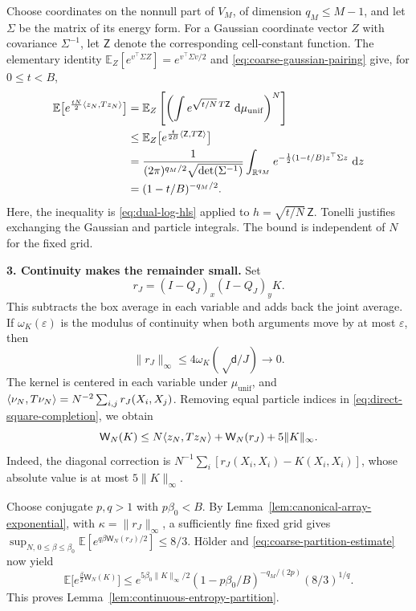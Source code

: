 \documentclass[11pt,reqno]{amsart}
\numberwithin{equation}{section}
\theoremstyle{plain}
\theoremstyle{definition}
\DeclarePairedDelimiter{\ip}{\langle}{\rangle}
\renewcommand{\d}{\mathsf d}
\newcommand{\dd}{\mathop{}\!\mathrm d}
\newcommand{\R}{\mathbb R}
\newcommand{\E}{\mathbb E}
\newcommand{\be}{\beta}
\newcommand{\muunif}{\mu_{\mathrm{unif}}}
\begin{document}
Choose coordinates on the nonnull part of $V_M$, of dimension $q_M\le M-1$, and let $\Sigma$ be the matrix of its energy form.  For a Gaussian coordinate vector $Z$ with covariance $\Sigma^{-1}$, let $\mathsf Z$ denote the corresponding cell-constant function.  The elementary identity
$\E_Z[e^{v^\top\Sigma Z}]=e^{v^\top\Sigma v/2}$ and \eqref{eq:coarse-gaussian-pairing} give, for $0\le t<B$,
\begin{equation}
 \begin{aligned}
 \E\big[e^{\frac{tN}2\ip{z_N,Tz_N}}\big]
 &=\E_Z\left[\left(\int e^{\sqrt{t/N}\,T\mathsf Z}
                           \,\dd\muunif\right)^N\right]\\
 &\le\E_Z\big[e^{\frac{t}{2B}\ip{\mathsf Z,T\mathsf Z}}\big]\\
 &=\frac1{(2\pi)^{q_M/2}\sqrt{\det(\Sigma^{-1})}}
   \int_{\R^{q_M}}e^{-\frac12(1-t/B)z^\top\Sigma z}\,\dd z\\
 &=(1-t/B)^{-q_M/2}.
 \end{aligned}
 \label{eq:coarse-partition-estimate}
\end{equation}
Here, the inequality is \eqref{eq:dual-log-hls} applied to
$h=\sqrt{t/N}\,\mathsf Z$.  Tonelli justifies exchanging the Gaussian and particle integrals.  The bound is independent of $N$ for the fixed grid.

\textbf{3. Continuity makes the remainder small.}
Set
\begin{equation}
 r_J=(I-Q_J)_x(I-Q_J)_yK.
 \label{eq:general-cell-centering}
\end{equation}
This subtracts the box average in each variable and adds back the joint average.  If $\omega_K(\varepsilon)$ is the modulus of continuity when both arguments move by at most $\varepsilon$, then
\begin{equation}
 \|r_J\|_\infty\le4\omega_K(\sqrt\d/J)\longrightarrow0.
 \label{eq:continuous-small-remainder}
\end{equation}
The kernel is centered in each variable under $\muunif$, and
$\ip{\nu_N,T\nu_N}=N^{-2}\sum_{i,j}r_J(X_i,X_j)$.
Removing equal particle indices in \eqref{eq:direct-square-completion}, we obtain
\begin{equation}
 \mathsf W_N(K)\le N\ip{z_N,Tz_N}
                  +\mathsf W_N(r_J)+5\|K\|_\infty.
 \label{eq:diagonal-correction-bound}
\end{equation}
Indeed, the diagonal correction is
$N^{-1}\sum_i[r_J(X_i,X_i)-K(X_i,X_i)]$, whose absolute value is at most $5\|K\|_\infty$.

Choose conjugate $p,q>1$ with $p\be_0<B$.  By Lemma~\ref{lem:canonical-array-exponential}, with $\kappa=\|r_J\|_\infty$, a sufficiently fine fixed grid gives
$\sup_{N,\,0\le\be\le\be_0}\E[e^{q\be\mathsf W_N(r_J)/2}]\le8/3$.
H\"older and \eqref{eq:coarse-partition-estimate} now yield
\begin{equation}
 \E\big[e^{\frac\be2\mathsf W_N(K)}\big]
 \le e^{5\be_0\|K\|_\infty/2}
      (1-p\be_0/B)^{-q_M/(2p)}(8/3)^{1/q}.
 \label{eq:continuous-proof-conclusion}
\end{equation}
This proves Lemma~\ref{lem:continuous-entropy-partition}.
\end{document}
